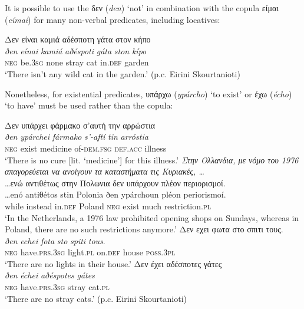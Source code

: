 ﻿\documentclass[output=paper]{langsci/langscibook}
\begin{document}
\begin{unindented}
It is possible to use the δεν (\textit{den}) `not' in combination with the
copula είμαι (\textit{eímai}) for many non-verbal predicates, including locatives:
%
\begin{exe}\ex \glll
Δεν είναι καμιά αδέσποτη γάτα στον κήπο \\
\textit{ðen} \textit{eínai} \textit{kamiá} \textit{aðéspoti} \textit{gáta} \textit{ston} \textit{kípo}\\
\textsc{neg} be.\textsc{3sg} none stray cat in.\textsc{def} garden \\
\glt `There isn't any wild cat in the garden.' (p.c. Eirini Skourtanioti)
    \end{exe}

Nonetheless, for existential predicates, υπάρχω (\textit{ypárcho}) `to
exist' or έχω (\textit{écho}) `to have' must be used rather than the copula:
%
\begin{exe}\ex \glll
Δεν υπάρχει φάρμακο σ'αυτή την αρρώστια \\
\textit{ðen} \textit{ypárchei} \textit{fármako} \textit{s’-aftí}
\textit{tin} \textit{arróstia} \\
\textsc{neg} exist medicine of-\textsc{dem.fsg} \textsc{def.acc} illness\\
    \glt `There is no cure [lit. ‘medicine'] for this illness.'
\parencite[493]{HoltonMackridge2012}
\ex \textit{Στην Ολλανδια, με νόμο του 1976 απαγορεύεται να ανοίγουν τα
καταστήματα τις Κυριακές, \ldots}\\
\glll
\ldots{}ενώ αντιθέτως στην Πολωνια δεν υπάρχουν πλέον περιορισμοί. \\
\ldots{}enó antiθétos stin Polonia ðen ypárchoun pléon periorismoí. \\
while instead in.\textsc{def} Poland \textsc{neg} exist much
restriction.\textsc{pl}\\
    \glt `In the Netherlands, a 1976 law prohibited opening shops on Sundays, whereas in Poland, there are no such restrictions anymore.' \citep[483]{Puigdollers2015}
\ex \glll
Δεν εχει φωτα στο σπιτι τους.  \\
\textit{ðen} \textit{echei} \textit{fota} \textit{sto} \textit{spiti} \textit{tous}.  \\
\textsc{neg} have.\textsc{prs.3sg} light.\textsc{pl} on.\textsc{def} house
\textsc{poss.3pl}\\
    \glt `There are no lights in their house.' \parencite[199]{HoltonMackridge2004}
\ex \glll
Δεν έχει αδέσποτες γάτες\\
\textit{ðen} \textit{échei} \textit{aðéspotes} \textit{gátes}\\
\textsc{neg}  have.\textsc{prs.3sg} stray cat.\textsc{pl} \\
    \glt `There are no stray cats.' (p.c. Eirini Skourtanioti)
    \end{exe}


\end{unindented}
\end{document}
